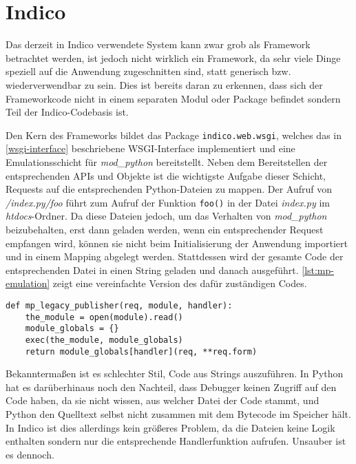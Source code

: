 \section{Indico}

Das derzeit in Indico verwendete System kann zwar grob als Framework betrachtet werden, ist jedoch
nicht wirklich ein Framework, da sehr viele Dinge speziell auf die Anwendung zugeschnitten sind,
statt generisch bzw. wiederverwendbar zu sein. Dies ist bereits daran zu erkennen, dass sich der
Frameworkcode nicht in einem separaten Modul oder Package befindet sondern Teil der Indico-Codebasis
ist.

Den Kern des Frameworks bildet das Package \lstinline{indico.web.wsgi}, welches das in
\autoref{wsgi-interface} beschriebene WSGI-Interface implementiert und eine Emulationsschicht für
\emph{mod\_python} bereitstellt. Neben dem Bereitstellen der entsprechenden APIs und Objekte ist die
wichtigste Aufgabe dieser Schicht, Requests auf die entsprechenden Python-Dateien zu mappen.
Der Aufruf von \emph{/index.py/foo} führt zum Aufruf der Funktion \lstinline{foo()}
in der Datei \emph{index.py} im \emph{htdocs}-Ordner. Da diese Dateien jedoch, um das Verhalten von
\emph{mod\_python} beizubehalten, erst dann geladen werden, wenn ein entsprechender Request
empfangen wird, können sie nicht beim Initialisierung der Anwendung importiert und in einem Mapping
abgelegt werden. Stattdessen wird der gesamte Code der entsprechenden Datei in einen String geladen
und danach ausgeführt. \autoref{lst:mp-emulation} zeigt eine vereinfachte Version des dafür
zuständigen Codes.

\begin{lstlisting}[caption=Laden der Legacy-Python-Dateien,label=lst:mp-emulation]
def mp_legacy_publisher(req, module, handler):
    the_module = open(module).read()
    module_globals = {}
    exec(the_module, module_globals)
    return module_globals[handler](req, **req.form)
\end{lstlisting}

Bekanntermaßen ist es schlechter Stil, Code aus Strings auszuführen. In Python hat es darüberhinaus
noch den Nachteil, dass Debugger keinen Zugriff auf den Code haben, da sie nicht wissen, aus welcher
Datei der Code stammt, und Python den Quelltext selbst nicht zusammen mit dem Bytecode im Speicher
hält. In Indico ist dies allerdings kein größeres Problem, da die Dateien keine Logik enthalten
sondern nur die entsprechende Handlerfunktion aufrufen. Unsauber ist es dennoch.

